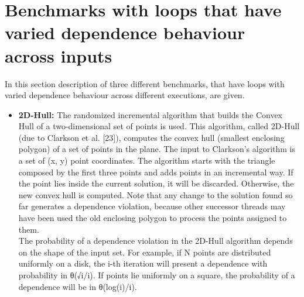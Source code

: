 \documentclass[10pt]{report}          %
\begin{document}
\section{Benchmarks with loops that have varied dependence behaviour across inputs}

In this section description of three different benchmarks, that have loops with varied dependence behaviour across different executions, are given.
\begin{itemize}
\item \textbf{2D-Hull:} The randomized incremental algorithm that builds the Convex Hull of a two-dimensional set of points is used. This algorithm, called 2D-Hull (due to Clarkson et al. [23]), computes the convex hull (smallest enclosing polygon) of a set of
points in the plane. The input to Clarkson's algorithm is a set of (x, y) point coordinates. The algorithm starts with the triangle composed by the ﬁrst three points and adds points in an incremental way. If the point lies inside the current solution, it will be discarded. Otherwise, the new convex hull is computed. Note that any change to the
solution found so far generates a dependence violation, because other successor threads may have been used the old enclosing polygon to process the points assigned to
them.\\
The probability of a dependence violation in the 2D-Hull algorithm depends on the shape of the input set. For example, if N points are distributed uniformly on a disk, the i-th iteration will present a dependence with probability in θ(√i/i). If points lie uniformly on a square, the probability of a dependence will be in θ(log(i)/i).


\end{itemize}
\end{document}
